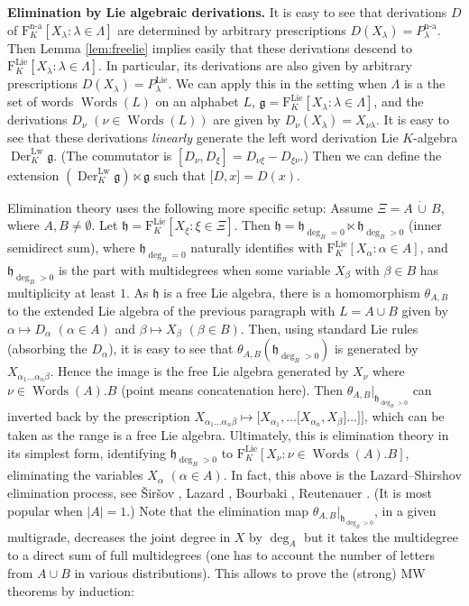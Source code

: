\documentclass[11pt,a4paper]{amsart}
\newcommand{\snewpage}{}
\newcommand{\snewpage}{\newpage}
\newcommand{\snewpage}{}
\DeclareMathOperator{\nonass}{n-a}
\DeclareMathOperator{\Lie}{Lie}
\DeclareMathOperator{\Der}{Der}
\DeclareMathOperator{\Words}{Words}
\newcommand{\bo}{\boldsymbol}
\newcommand{\lw}{\mathrm{Lw}}
\theoremstyle{definition}
\theoremstyle{plain}
\begin{document}
\snewpage

\textbf{Elimination by Lie algebraic derivations.}
It is easy to see that derivations $D$ of $\mathrm F^{\nonass}_K[X_\lambda :\lambda\in\Lambda]$ are determined by arbitrary prescriptions
$D(X_\lambda)=P^{\nonass}_\lambda$.
Then Lemma \ref{lem:freelie} implies easily that these derivations descend to  $\mathrm F^{\Lie}_K[X_\lambda :\lambda\in\Lambda]$.
In particular, its derivations are also given by  arbitrary prescriptions $D(X_\lambda)=P_\lambda^{\Lie}$.
We can apply this in the setting when $\Lambda$ is a the set of words $\Words(L)$ on an alphabet $L$,
$\mathfrak g=\mathrm F^{\Lie}_K[X_\lambda :\lambda\in\Lambda]$,
 and the derivations
$D_\nu $ $(\nu\in \Words(L))$ are given by $D_\nu(X_\lambda)=X_{\nu\lambda}$.
It is easy  to see that these derivations \textit{linearly} generate the left word derivation
Lie $K$-algebra $\Der^{\lw}_K \mathfrak g$.
(The commutator is $[D_\nu,D_\xi]=D_{\nu\xi}-D_{\xi\nu}$.)
Then we can define  the extension $(\Der^{\lw}_K \mathfrak g)\ltimes\mathfrak g$ such that $\bo[D,x\bo]=D(x)$.

Elimination theory uses the following more specific setup:
Assume $\Xi=A\,\dot\cup\,B$, where $A,B\neq\emptyset$.
Let $\mathfrak h=\mathrm F^{\Lie}_K[X_\xi :\xi\in\Xi]$.
Then $\mathfrak h=\mathfrak h_{\deg_B=0}\ltimes\mathfrak h_{\deg_B>0}$
 (inner semidirect sum), where $\mathfrak h_{\deg_B=0}$ naturally identifies with
 $\mathrm F^{\Lie}_K[X_\alpha :\alpha\in A]$, and $\mathfrak h_{\deg_B>0}$ is the part with multidegrees when
 some variable $X_\beta$ with $\beta\in B$ has multiplicity at least $1$.
As $\mathfrak h$ is a free Lie algebra, there is a homomorphism $\theta_{A,B}$ to the extended Lie algebra of the
 previous paragraph with $L=A\cup B$ given by $\alpha\mapsto D_\alpha$  $(\alpha\in A)$
 and  $\beta\mapsto X_\beta$  $(\beta\in B)$.
Then, using standard Lie rules (absorbing the $D_\alpha$), it is easy to see that $\theta_{A,B}(\mathfrak h_{\deg_B>0})$
 is generated by $X_{\alpha_1\ldots\alpha_n\beta}$.
Hence the image is the free Lie algebra generated by $X_\nu$ where $\nu\in\Words(A).B$ (point means concatenation here).
Then $\theta_{A,B}|_{\mathfrak h_{\deg_B>0}}$ can inverted back by the prescription
 $X_{\alpha_1\ldots\alpha_n\beta}\mapsto\bo[X_{\alpha_1},\bo\ldots\bo[X_{\alpha_n},X_\beta\bo]\ldots\bo]\bo]$,
 which can be taken as the range is a free Lie algebra.
Ultimately,  this is elimination theory in its simplest form,
 identifying $\mathfrak h_{\deg_B>0}$ to $\mathrm F^{\Lie}_K[X_\nu :\nu\in\Words(A).B]$,
 eliminating the variables $X_\alpha$ $(\alpha\in A)$.
In fact, this above is the Lazard--Shirshov elimination process,
 see \v{S}ir\v{s}ov \cite{S0}, Lazard \cite{L2}, Bourbaki \cite{BX}, Reutenauer \cite{R}.
(It is most popular when $|A|=1$.)
Note that the elimination map $\theta_{A,B}|_{\mathfrak h_{\deg_B>0}}$, in a given multigrade,
 decreases the joint degree in $X$ by $\deg_A$ but it takes the multidegree to a direct sum of full multidegrees
(one has to account the number of letters from $A\cup B$ in various distributions).
This allows to prove the (strong) MW theorems by induction:
\snewpage
\end{document}
